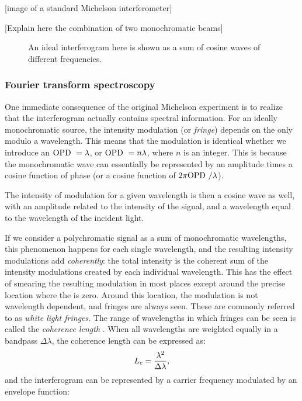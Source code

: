 [image of a standard Michelson interferometer]

[Explain here the combination of two monochromatic beams]


\begin{figure}[!ht]
	\centering
	
	\caption[Simple interferogram]{An ideal interferogram here is shown as a sum of cosine waves of different frequencies.}
	\label{fig:interferogram}
    \end{figure}

\subsubsection{Fourier transform spectroscopy}

One immediate consequence of the original Michelson experiment is to realize that the interferogram actually contains spectral information. For an ideally monochromatic source, the intensity modulation (or \textit{fringe}) depends on the \OPD only modulo a wavelength. This means that the modulation is identical whether we introduce an $\textrm{OPD }  = \lambda$, or $\textrm{OPD }  = n\lambda$, where $n$ is an integer. This is because the monochromatic wave can essentially be represented by an amplitude times a cosine function of phase (or a cosine function of $2\pi\textrm{OPD } /\lambda$).

The intensity of modulation for a given wavelength is then a cosine wave as well, with an amplitude related to the intensity of the signal, and a wavelength equal to the wavelength of the incident light.

If we consider a polychromatic signal as a sum of monochromatic wavelengths, this phenomenon happens for each single wavelength, and the resulting intensity modulations add \textit{coherently}: the total intensity is the coherent sum of the intensity modulations created by each individual wavelength. This has the effect of smearing the resulting modulation in most places except around the precise location where the \OPD is zero. Around this location, the modulation is not wavelength dependent, and fringes are always seen. These are commonly referred to as \textit{white light fringes}. The range of wavelengths in which fringes can be seen is called the \textit{coherence length} \Lc. When all wavelengths are weighted equally in a bandpass $\Delta\lambda$, the coherence length can be expressed as:
\begin{equation}
L_c = \frac{\lambda^2}{\Delta\lambda},
\end{equation}
and the interferogram can be represented by a carrier frequency modulated by an envelope function:

